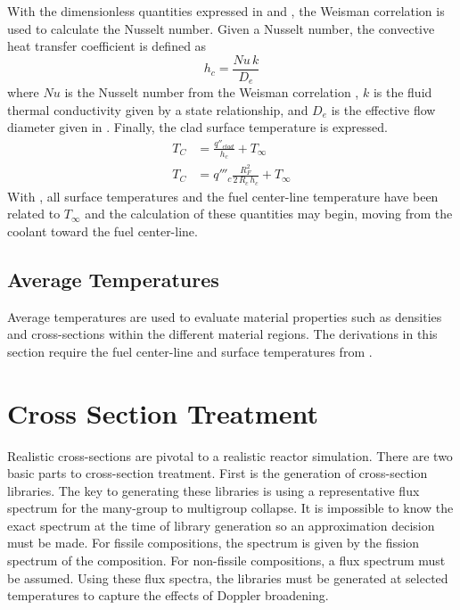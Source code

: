       With the dimensionless quantities expressed in  and
      , the Weisman correlation is used to calculate the Nusselt
      number. Given a Nusselt number, the convective heat transfer coefficient
      is defined as
      \begin{equation}
        \label{eq:hc}
        h_c = \frac{Nu \, k}{D_e}
      \end{equation}
      where $Nu$ is the Nusselt number from the Weisman correlation
      , $k$ is the fluid thermal conductivity given by a state
      relationship, and $D_e$ is the effective flow diameter given in
      . Finally, the clad surface temperature is expressed.
      \begin{align}
        T_C &= \frac{q''_{clad}}{h_c} + T_{\infty} \\
        \label{eq:tc}
        T_C &= q'''_c \frac{R_F^2}{2\,R_c\,h_c} + T_{\infty}
      \end{align}
      With , all surface temperatures and the fuel center-line
      temperature have been related to $T_{\infty}$ and the calculation of these
      quantities may begin, moving from the coolant toward the fuel center-line.

  \subsection{Average Temperatures}
    \label{sec:average_temps}
    Average temperatures are used to evaluate material properties such as
    densities and cross-sections within the different material regions. The
    derivations in this section require the fuel center-line and surface
    temperatures from . 

\section{Cross Section Treatment}
  Realistic cross-sections are pivotal to a realistic reactor simulation. There
  are two basic parts to cross-section treatment. First is the generation of
  cross-section libraries. The key to generating these libraries is using a
  representative flux spectrum for the many-group to multigroup collapse. It is
  impossible to know the exact spectrum at the time of library generation so an
  approximation decision must be made.
  For fissile compositions, the spectrum is given by the
  fission spectrum of the composition. For non-fissile compositions, a flux
  spectrum must be assumed.  Using these flux spectra, the libraries must
  be generated at selected temperatures to capture the effects of Doppler
  broadening.

